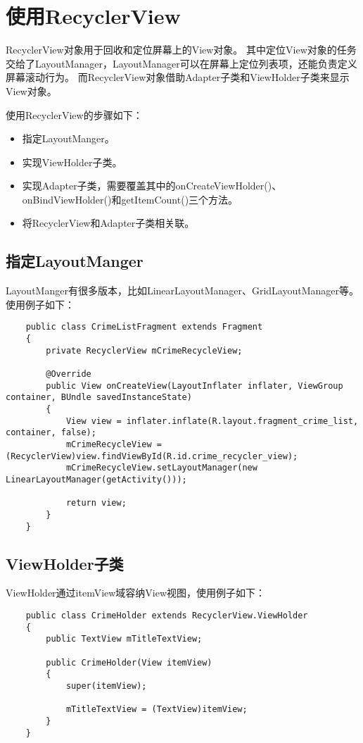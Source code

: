 \documentclass[a4paper,left=2.5cm,right=2.5cm,11pt]{article}
\begin{document}


\section{使用RecyclerView}
	RecyclerView对象用于回收和定位屏幕上的View对象。
	其中定位View对象的任务交给了LayoutManager，LayoutManager可以在屏幕上定位列表项，还能负责定义屏幕滚动行为。
	而RecyclerView对象借助Adapter子类和ViewHolder子类来显示View对象。\par

	使用RecyclerView的步骤如下：
	\begin{itemize}
		\item 指定LayoutManger。
		\item 实现ViewHolder子类。
		\item 实现Adapter子类，需要覆盖其中的onCreateViewHolder()、onBindViewHolder()和getItemCount()三个方法。
		\item 将RecyclerView和Adapter子类相关联。
	\end{itemize}

\subsection{指定LayoutManger}
	LayoutManger有很多版本，比如LinearLayoutManager、GridLayoutManager等。使用例子如下：
	\begin{lstlisting}
	public class CrimeListFragment extends Fragment
	{
		private RecyclerView mCrimeRecycleView;

		@Override
		public View onCreateView(LayoutInflater inflater, ViewGroup container, BUndle savedInstanceState)
		{
			View view = inflater.inflate(R.layout.fragment_crime_list, container, false);
			mCrimeRecycleView = (RecyclerView)view.findViewById(R.id.crime_recycler_view);
			mCrimeRecycleView.setLayoutManager(new LinearLayoutManager(getActivity()));

			return view;
		}
	}
	\end{lstlisting}

\subsection{ViewHolder子类}
	ViewHolder通过itemView域容纳View视图，使用例子如下：
	\begin{lstlisting}
	public class CrimeHolder extends RecyclerView.ViewHolder
	{
		public TextView mTitleTextView;

		public CrimeHolder(View itemView)
		{
			super(itemView);

			mTitleTextView = (TextView)itemView;
		}
	}
	\end{lstlisting}
\end{document}
